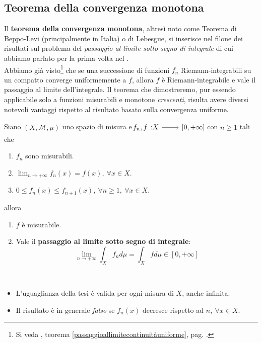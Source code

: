 \subsection{Teorema della convergenza monotona}
Il \textbf{teorema della convergenza monotona}, altresì noto come Teorema di Beppo-Levi (principalmente in Italia) o di Lebesgue, si inserisce nel filone dei risultati sul problema del \textit{passaggio al limite sotto segno di integrale} di cui abbiamo parlato per la prima volta nel .\\
Abbiamo già visto\footnote{Si veda , teorema \ref{passaggioallimitecontinuitàuniforme}, pag. \pageref{passaggioallimitecontinuitàuniforme}.} che se una successione di funzioni $f_n$ Riemann-integrabili su un compatto converge uniformemente a $f$, allora $f$ è Riemann-integrabile e vale il passaggio al limite dell'integrale. Il teorema che dimostreremo, pur essendo applicabile solo a funzioni misurabili e monotone \textit{crescenti}, risulta avere diversi notevoli vantaggi rispetto al risultato basato sulla convergenza uniforme.
\begin{theorema}
	Siano $\left(X,\mathcal{M},\mu\right)$ uno spazio di misura e $\funz{f_n,f}{X}{\left[0,+\infty\right]}$ con $n\geq 1$ tali che
	\begin{enumerate}
		\item $f_n$ sono misurabili.
		\item $\displaystyle\lim_{n\to+\infty}f_n\left(x\right)=f\left(x\right),\ \forall x\in X$.
		\item $0\leq f_n\left(x\right)\leq f_{n+1}\left(x\right),\ \forall n\geq 1,\ \forall x\in X$.
	\end{enumerate}
allora
\begin{enumerate}
	\item $f$ è misurabile.
	\item Vale il \textbf{passaggio al limite sotto segno di integrale}:
	\begin{equation}
		\lim_{n\to+\infty}\int_Xf_nd\mu=\int_Xfd\mu\in\left[0,+\infty\right]
	\end{equation}
\end{enumerate}
\end{theorema}
\begin{observe}~{}
	\begin{itemize}
		\item L'uguaglianza della tesi è valida per ogni misura di $X$, anche infinita.
		\item Il risultato è in generale \textit{falso} se $f_n\left(x\right)$ decresce rispetto ad $n,\ \forall x\in X$.
	\end{itemize}
\end{observe}
